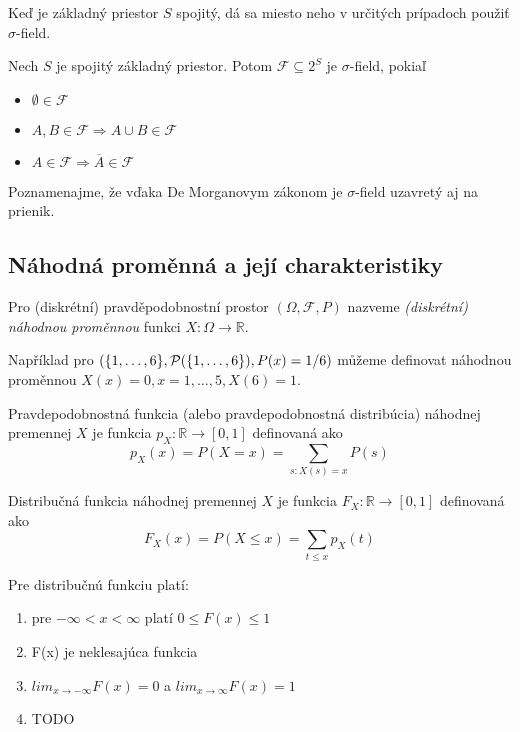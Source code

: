 {Keď je základný priestor $S$ spojitý, dá sa miesto neho
v určitých prípadoch použiť $\sigma$-field.

\begin{definition}
	Nech $S$ je spojitý základný priestor. Potom $\mathscr{F} \subseteq 2^S$
	je $\sigma$-field, pokiaľ
	\begin{itemize}
		\item $\emptyset \in \mathscr{F}$
		\item $A,B \in \mathscr{F} \Rightarrow A \cup B \in \mathscr{F}$
		\item $A \in \mathscr{F} \Rightarrow \overline{A} \in \mathscr{F}$
	\end{itemize}
\end{definition}

Poznamenajme, že vďaka De Morganovym zákonom je $\sigma$-field uzavretý
aj na prienik.

\subsection{Náhodná proměnná a její charakteristiky}

\begin{definition}
    Pro (diskrétní) pravděpodobnostní prostor $(\Omega, \mathcal{F}, P)$
    nazveme {\em (diskrétní) náhodnou proměnnou} funkci $X : \Omega \to \mathbb{R}$.
\end{definition}

\begin{example}
    Například pro
    $(\{1,\ldots,6\}, \mathcal{P}(\{1,\ldots,6\}), P(x) = 1/6)$
    můžeme definovat náhodnou proměnnou
    $X(x) = 0, x = 1,\ldots,5, X(6) = 1$.
\end{example}

\begin{definition}
    Pravdepodobnostná funkcia (alebo pravdepodobnostná distribúcia)
	náhodnej premennej $X$ je funkcia $p_X: \mathbb{R} \to [0,1]$ definovaná ako
	\[
    p_X(x) = P(X=x) = \sum_{s:X(s)=x}P(s)
    \]
\end{definition}

\begin{definition}
    Distribučná funkcia
	náhodnej premennej $X$ je funkcia $F_X: \mathbb{R} \to [0,1]$ definovaná ako
	\[
    F_X(x) = P(X\leq x) = \sum_{t \leq x}p_X(t)
    \]
\end{definition}

Pre distribučnú funkciu platí:
\begin{enumerate}
	\item pre $-\infty < x < \infty$ platí $0 \leq F(x) \leq 1$
	\item F(x) je neklesajúca funkcia
	\item $lim_{x \to -\infty}F(x) = 0$ a $lim_{x \to \infty}F(x) = 1$
	\item TODO
\end{enumerate}

}
